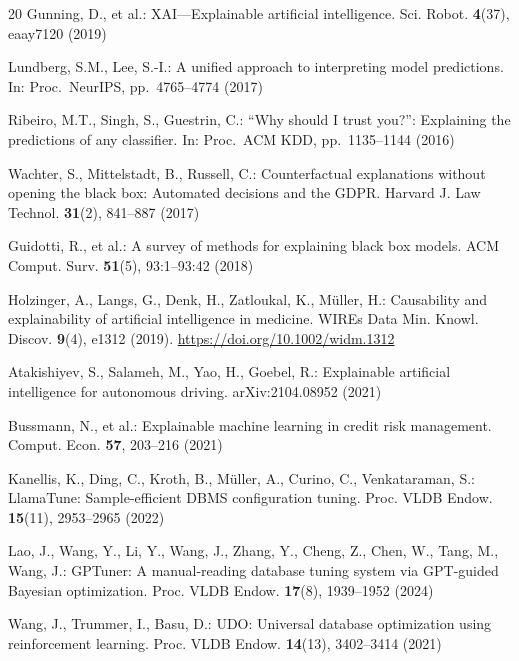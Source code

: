 \documentclass[pdflatex,sn-mathphys-num]{sn-jnl}
\theoremstyle{thmstyleone}
\theoremstyle{thmstylethree}
\begin{document}
\begin{thebibliography}{20}
Gunning, D., et al.: XAI---Explainable artificial intelligence. Sci.
Robot. \textbf{4}(37), eaay7120 (2019)

Lundberg, S.M., Lee, S.-I.: A unified approach to interpreting model
predictions. In: Proc.\ NeurIPS, pp.\ 4765--4774 (2017)

Ribeiro, M.T., Singh, S., Guestrin, C.: ``Why should I trust you?'':
Explaining the predictions of any classifier. In: Proc.\ ACM KDD, pp.\
1135--1144 (2016)

Wachter, S., Mittelstadt, B., Russell, C.: Counterfactual explanations
without opening the black box: Automated decisions and the GDPR.
Harvard J. Law Technol. \textbf{31}(2), 841--887 (2017)

Guidotti, R., et al.: A survey of methods for explaining black box
models. ACM Comput. Surv. \textbf{51}(5), 93:1--93:42 (2018)

Holzinger, A., Langs, G., Denk, H., Zatloukal, K., M\"uller, H.:
Causability and explainability of artificial intelligence in
medicine. WIREs Data Min. Knowl. Discov. \textbf{9}(4), e1312 (2019).
\url{https://doi.org/10.1002/widm.1312}

Atakishiyev, S., Salameh, M., Yao, H., Goebel, R.: Explainable
artificial intelligence for autonomous driving. arXiv:2104.08952
(2021)

Bussmann, N., et al.: Explainable machine learning in credit risk
management. Comput. Econ. \textbf{57}, 203--216 (2021)

Kanellis, K., Ding, C., Kroth, B., M\"uller, A., Curino, C.,
Venkataraman, S.: LlamaTune: Sample-efficient DBMS configuration
tuning. Proc. VLDB Endow. \textbf{15}(11), 2953--2965 (2022)

Lao, J., Wang, Y., Li, Y., Wang, J., Zhang, Y., Cheng, Z., Chen, W.,
Tang, M., Wang, J.: GPTuner: A manual-reading database tuning system
via GPT-guided Bayesian optimization. Proc. VLDB Endow.
\textbf{17}(8), 1939--1952 (2024)

Wang, J., Trummer, I., Basu, D.: UDO: Universal database optimization
using reinforcement learning. Proc. VLDB Endow. \textbf{14}(13),
3402--3414 (2021)

\end{thebibliography}
\end{document}
